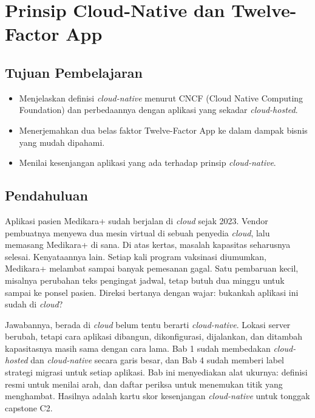 \chapter{Prinsip Cloud-Native dan Twelve-Factor App}
\label{ch:ch05-prinsip}


\section*{Tujuan Pembelajaran}
\begin{itemize}
  \item Menjelaskan definisi \textit{cloud-native} menurut CNCF (Cloud Native Computing
        Foundation) dan perbedaannya dengan aplikasi yang sekadar \textit{cloud-hosted}.
  \item Menerjemahkan dua belas faktor Twelve-Factor App ke dalam dampak bisnis yang mudah
        dipahami.
  \item Menilai kesenjangan aplikasi yang ada terhadap prinsip \textit{cloud-native}.
\end{itemize}

\section{Pendahuluan}

Aplikasi pasien Medikara+ sudah berjalan di \textit{cloud} sejak 2023. Vendor pembuatnya
menyewa dua mesin virtual di sebuah penyedia \textit{cloud}, lalu memasang Medikara+ di
sana. Di atas kertas, masalah kapasitas seharusnya selesai. Kenyataannya lain. Setiap kali
program vaksinasi diumumkan, Medikara+ melambat sampai banyak pemesanan gagal. Satu
pembaruan kecil, misalnya perubahan teks pengingat jadwal, tetap butuh dua minggu untuk
sampai ke ponsel pasien. Direksi bertanya dengan wajar: bukankah aplikasi ini sudah di
\textit{cloud}?

Jawabannya, berada di \textit{cloud} belum tentu berarti \textit{cloud-native}. Lokasi
server berubah, tetapi cara aplikasi dibangun, dikonfigurasi, dijalankan, dan ditambah
kapasitasnya masih sama dengan cara lama. Bab 1 sudah membedakan \textit{cloud-hosted} dan
\textit{cloud-native} secara garis besar, dan Bab 4 sudah memberi label strategi migrasi
untuk setiap aplikasi. Bab ini menyediakan alat ukurnya: definisi resmi untuk menilai arah,
dan daftar periksa untuk menemukan titik yang menghambat. Hasilnya adalah kartu skor
kesenjangan \textit{cloud-native} untuk tonggak capstone C2.

